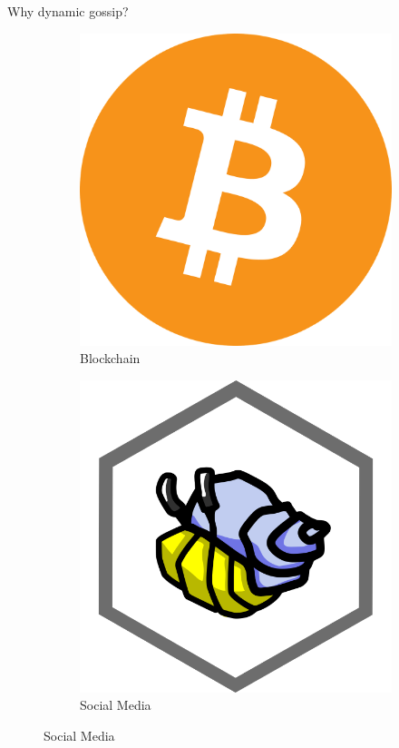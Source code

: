 \documentclass[aspectratio=169]{beamer}
\begin{document}
\begin{frame}[c]{Why dynamic gossip?}
    \begin{figure}
      \begin{subfigure}[t]{.3\paperwidth}
        \centering
        \includegraphics[height=.3\paperheight]{images/bitcoin.png}
        \caption*{Blockchain}
      \end{subfigure}
      \qquad
      \begin{subfigure}[t]{.3\paperwidth}
        \centering
        \includegraphics[height=.3\paperheight]{images/ssbc.png}
        \caption*{Social Media}
      \end{subfigure}


\end{figure}
\end{frame}
\end{document}
